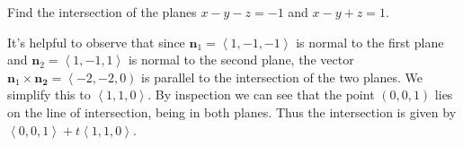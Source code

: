 \documentclass[answers,12pt,addpoints]{exam}
\begin{document}
\begin{questions}
\question[25] Find the intersection of the planes
$x-y-z=-1$ and $x-y+z=1$.
\begin{solution}[1in]
It's helpful to observe that since
$\mathbold{n}_1=\left\langle 1,-1,-1\right\rangle$
is normal to the first plane and
$\mathbold{n}_2=\left\langle 1,-1,1\right\rangle$
is normal to the second plane,
the vector $\mathbold{n}_1\times\mathbold{n_2}
=\left\langle -2,-2,0\right)$ is parallel to the
intersection of the two planes.
We simplify this to $\left\langle 1,1,0\right\rangle$.
By inspection we can see that the point $\left(0,0,1\right)$
lies on the line of intersection, being in both planes.
Thus the intersection is given by
$\left\langle 0,0,1\right\rangle
+t\left\langle 1,1,0\right\rangle$.

\end{solution}

\end{questions}
\end{document}
